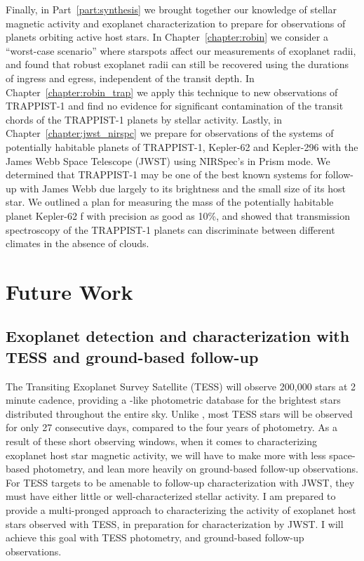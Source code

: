 Finally, in Part~\ref{part:synthesis} we brought together our knowledge of stellar magnetic activity and exoplanet characterization to prepare for observations of planets orbiting active host stars. In Chapter~\ref{chapter:robin} we consider a ``worst-case scenario'' where starspots affect our measurements of exoplanet radii, and found that robust exoplanet radii can still be recovered using the durations of ingress and egress, independent of the transit depth. In Chapter~\ref{chapter:robin_trap} we apply this technique to new \spitzer observations of TRAPPIST-1 and find no evidence for significant contamination of the transit chords of the TRAPPIST-1 planets by stellar activity. Lastly, in Chapter~\ref{chapter:jwst_nirspc} we prepare for observations of the systems of potentially habitable planets of TRAPPIST-1, Kepler-62 and Kepler-296 with the James Webb Space Telescope (JWST) using NIRSpec's in Prism mode. We determined that TRAPPIST-1 may be one of the best known systems for follow-up with James Webb due largely to its brightness and the small size of its host star. We outlined a plan for measuring the mass of the potentially habitable planet Kepler-62 f with precision as good as 10\%, and showed that transmission spectroscopy of the TRAPPIST-1 planets can discriminate between different climates in the absence of clouds. 

\section{Future Work}

\subsection{Exoplanet detection and characterization with TESS and ground-based follow-up}

The Transiting Exoplanet Survey Satellite (TESS) will observe 200,000 stars at 2 minute cadence, providing a \kepler-like photometric database for the brightest stars distributed throughout the entire sky. Unlike \kepler, most TESS stars will be observed for only 27 consecutive days, compared to the four years of \kepler photometry. As a result of these short observing windows, when it comes to characterizing exoplanet host star magnetic activity, we will have to make more with less space-based photometry, and lean more heavily on ground-based follow-up observations. For TESS targets to be amenable to follow-up characterization with JWST, they must have either little or well-characterized stellar activity. I am prepared to provide a multi-pronged approach to characterizing the activity of exoplanet host stars observed with TESS, in preparation for characterization by JWST. I will achieve this goal with TESS photometry, and ground-based follow-up observations.

